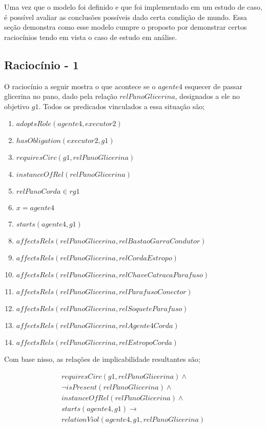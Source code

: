 \label{racs}

Uma vez que o modelo foi definido e que foi implementado em um estudo de caso, é possível avaliar as conclusões possíveis dado certa condição de mundo. Essa seção demonstra como esse modelo cumpre o proposto por demonstrar certos raciocínios tendo em vista o caso de estudo em análise. 

\subsection{Raciocínio - 1} 
\label{raciocinio1}

O raciocínio a seguir mostra o que acontece se o $agente4$ esquecer de passar glicerina no pano, dado pela relação $relPanoGlicerina$, designados a ele no objetivo $g1$. 
Todos os predicados vinculados a essa situação são;

\begin{enumerate}
	\item $adoptsRole(agente4,executor2)$ 
	\item $hasObligation(executor2,g1)$
	\item $requiresCirc(g1,relPanoGlicerina)$
	\item $instanceOfRel(relPanoGlicerina)$ 
	\item $relPanoCorda \in rg1$
	\item $ x = agente4 $
	\item $starts(agente4,g1)$
	\item $affectsRels(relPanoGlicerina,relBastaoGarraCondutor)$
	\item $affectsRels(relPanoGlicerina,relCordaEstropo)$  
	\item $affectsRels(relPanoGlicerina,relChaveCatracaParafuso)$
	\item $affectsRels(relPanoGlicerina,relParafusoConector)$ 
	\item $affectsRels(relPanoGlicerina,relSoqueteParafuso)$ 
	\item $affectsRels(relPanoGlicerina,relAgente4Corda)$ 
	\item $affectsRels(relPanoGlicerina,relEstropoCorda)$	
\end{enumerate}

Com base nisso, as relações de implicabilidade resultantes são;

\begin{eqnarray}\nonumber
	requiresCirc(g1,relPanoGlicerina) \wedge \nonumber \\  
	\neg isPresent(relPanoGlicerina) \wedge \nonumber \\   
	instanceOfRel(relPanoGlicerina) \wedge \nonumber \\   
	starts(agente4,g1) \to \nonumber \\
	relationViol(agente4,g1,relPanoGlicerina) \nonumber \\  
\end{eqnarray}

